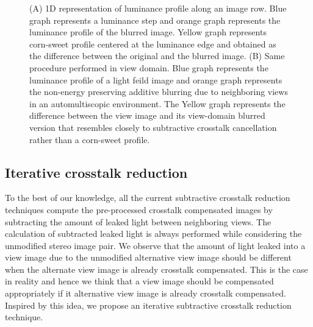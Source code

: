 \begin{figure}[htbp]
    \caption{(A) 1D representation of luminance profile along an image row. Blue graph represents a luminance step and orange graph represents the luminance profile of the blurred image. Yellow graph represents corn-sweet profile centered at the luminance edge and obtained as the difference between the original and the blurred image.  (B) Same procedure performed in view domain. Blue graph represents the luminance profile of a light feild image and orange graph represents the non-energy preserving additive blurring due to neighboring views in an automultiscopic environment. The Yellow graph represents the difference between the view image and its view-domain blurred version that resembles closely to subtractive crosstalk cancellation rather than a corn-sweet profile.\label{fig:why_no_cornsweet}}
\end{figure}

\subsection{Iterative crosstalk reduction}

To the best of our knowledge, all the current subtractive crosstalk reduction techniques compute the pre-processed crosstalk compensated images by subtracting the amount of leaked light between neighboring views. The calculation of subtracted leaked light is always performed while considering the unmodified stereo image pair. We observe that the amount of light leaked into a view image due to the unmodified alternative view image should be different when the alternate view image is already crosstalk compensated. This is the case in reality and hence we think that a view image should be compensated appropriately if it alternative view image is already crosstalk compensated. Inspired by this idea, we propose an iterative subtractive crosstalk reduction technique.


